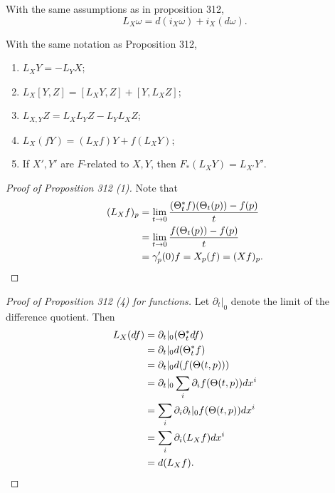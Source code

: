 \documentclass[twoside, 10pt]{article}
\begin{document}
    \begin{thm}
        With the same assumptions as in proposition 312,
        \[L_X \omega = d(i_X \omega) + i_X(d\omega).\]
    \end{thm}

    \begin{cor}
        With the same notation as Proposition 312,
        \begin{enumerate}[label=(\alph*)]
            \item $L_X Y = - L_Y X$;
            \item $L_X[Y,Z] = [L_X Y, Z] + [Y, L_X Z]$;
            \item $L_{X,Y} Z = L_X L_Y Z - L_Y L_X Z$;
            \item $L_X(fY) = (L_X f)Y + f(L_X Y)$;
            \item If $X', Y'$ are $F$-related to $X,Y$, then $F_*(L_X Y) = L_{X'}Y'$.
        \end{enumerate}
    \end{cor}

    \begin{proof}[Proof of Proposition 312 (1)]
        Note that
        \begin{align*}
            (L_X f)_p &= \lim_{t \to 0} \frac{(\Theta_t^* f)(\Theta_t(p)) - f(p)}{t} \\
                      &= \lim_{t \to 0} \frac{f(\Theta_t(p)) - f(p)}{t} \\
                      &= \gamma_p'(0) f = X_p(f) = (Xf)_p. \qedhere
        \end{align*}
    \end{proof}

    \begin{proof}[Proof of Proposition 312 (4) for functions]
        Let $\partial_t |_0$ denote the limit of the difference quotient. Then 
        \begin{align*}
            L_X(df) &= \partial_t |_0 (\Theta_t^* df) \\
                    &= \partial_t |_0 d(\Theta_t^* f) \\
                    &= \partial_t |_0 d(f(\Theta(t,p))) \\
                    &= \partial_t |_0 \sum_i \partial_i f(\Theta(t,p)) dx^i \\
                    &= \sum_i \partial_i \partial_t |_0 f(\Theta(t,p)) dx^i \\
                    &= \sum_i \partial_i(L_X f) dx^i \\
                    &= d(L_X f). \qedhere
        \end{align*}
    \end{proof}
\end{document}
